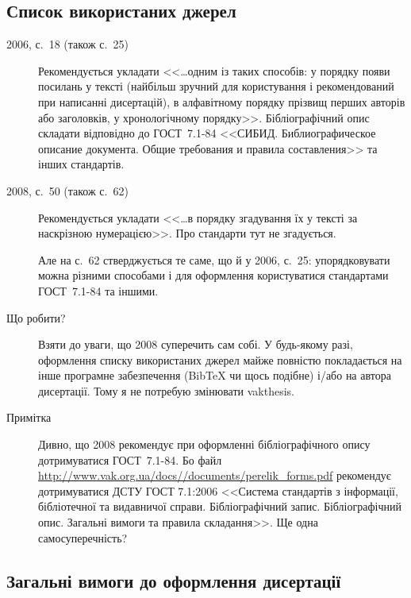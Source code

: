 \documentclass[a4paper]{article}
\newcommand{\vakthesis}{\textsf{vakthesis}}
\begin{document}
\subsection{Список використаних джерел}

\begin{description}
\item[2006, с.~18 (також с.~25)] Рекомендується укладати
  <<\ldots{}одним із таких способів: у порядку появи посилань у тексті
  (найбільш зручний для користування і рекомендований при написанні
  дисертацій), в алфавітному порядку прізвищ перших авторів або
  заголовків, у хронологічному порядку>>. Бібліографічний опис
  складати відповідно до ГОСТ~7.1-84 <<СИБИД. Библиографическое
  описание документа. Общие требования и правила составления>> та
  інших стандартів.

\item[2008, с.~50 (також с.~62)] Рекомендується укладати <<\ldots{}в
  порядку згадування їх у тексті за наскрізною нумерацією>>. Про
  стандарти тут не згадується.

  Але на с.~62 стверджується те саме, що й у 2006, с.~25:
  упорядковувати можна різними способами і для оформлення
  користуватися стандартами ГОСТ~7.1-84 та іншими.

\item[Що робити?] Взяти до уваги, що 2008 суперечить сам собі. У
  будь-якому разі, оформлення списку використаних джерел майже
  повністю покладається на інше програмне забезпечення (Bib\TeX{} чи
  щось подібне) і/або на автора дисертації. Тому я не потребую
  змінювати \vakthesis{}.

\item[Примітка] Дивно, що 2008 рекомендує при оформленні
  бібліографічного опису дотримуватися ГОСТ~7.1-84. Бо файл
  \url{http://www.vak.org.ua/docs//documents/perelik_forms.pdf}
  рекомендує дотримуватися ДСТУ ГОСТ 7.1:2006 <<Система стандартів з
  інформації, бібліотечної та видавничої справи. Бібліографічний
  запис. Бібліографічний опис. Загальні вимоги та правила
  складання>>. Ще одна самосуперечність?
\end{description}

\subsection{Загальні вимоги до оформлення дисертації}
\end{document}
